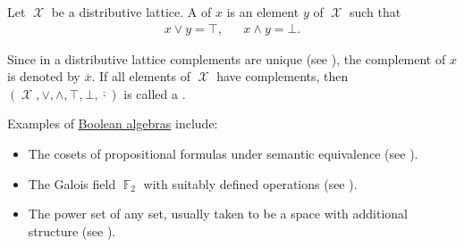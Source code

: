 \begin{definition}\label{def:boolean_algebra}\mcite\cite{nLab:boolean_algebra}
  Let \( \mscrX \) be a distributive lattice. A  of \( x \) is an element \( y \) of \( \mscrX \) such that
  \begin{align}\label{eq:def:boolean_algebra/complement}
    x \vee y = \top, && x \wedge y = \bot.
  \end{align}

  Since in a distributive lattice complements are unique (see ), the complement of \( x \) is denoted by \( \overline x \). If all elements of \( \mscrX \) have complements, then \( (\mscrX, \vee, \wedge, \top, \bot, \overline \cdot) \) is called a .
\end{definition}

\begin{example}\label{ex:boolean_algebras}
  Examples of \hyperref[def:boolean_algebra]{Boolean algebras} include:

  \begin{itemize}
    \item The cosets of propositional formulas under semantic equivalence (see ).
    \item The Galois field \( \BbbF_2 \) with suitably defined operations (see ).
    \item The power set of any set, usually taken to be a space with additional structure (see ).
  \end{itemize}
\end{example}

